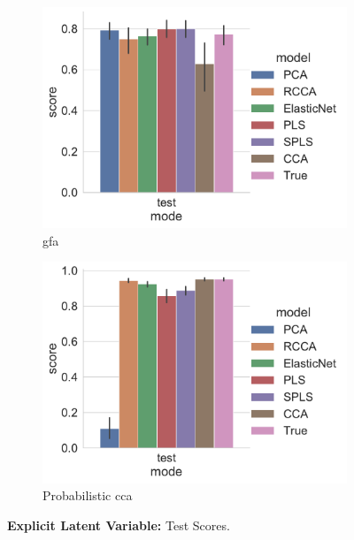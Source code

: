 \begin{figure}
    \centering
    \begin{subfigure}{0.49\linewidth}
        \centering
        \includegraphics[width=\linewidth]{figures/simulated/low/Train_Test_Scores_Identity_Covariance_explicit}
        \caption{\acrshort{gfa}}
    \end{subfigure}
    \begin{subfigure}{0.49\linewidth}
        \centering
        \includegraphics[width=\linewidth]{figures/simulated/low/Train_Test_Scores_Random_Covariance_explicit}
        \caption{Probabilistic \acrshort{cca}}
    \end{subfigure}
    \caption{\textbf{Explicit Latent Variable:} Test Scores.}\label{fig:explicit-latent-variable-scores}
\end{figure}

